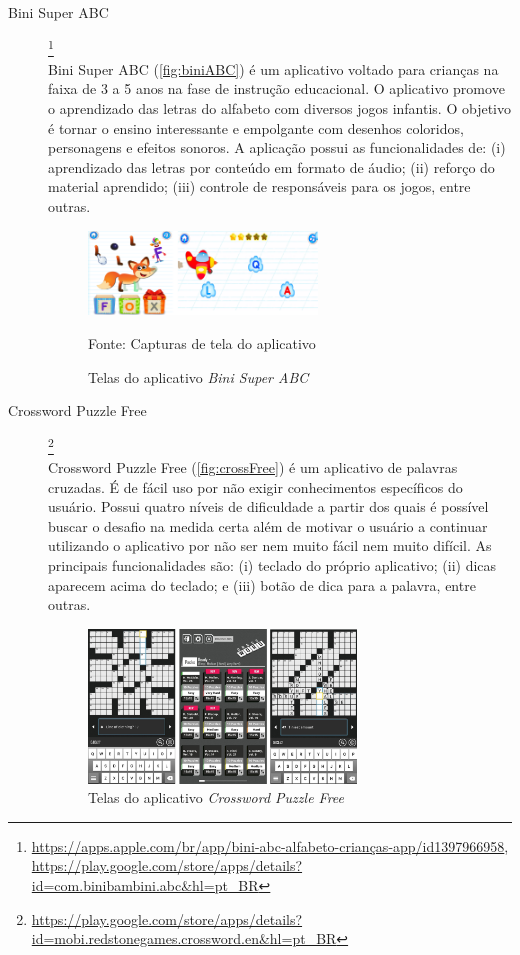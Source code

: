 \begin{description}
\item[Bini Super ABC]\footnote{\url{https://apps.apple.com/br/app/bini-abc-alfabeto-crianças-app/id1397966958}, \url{https://play.google.com/store/apps/details?id=com.binibambini.abc&hl=pt_BR}} \hfill \\
Bini Super ABC (\autoref{fig:biniABC}) é um aplicativo voltado para crianças na faixa de 3 a 5 anos na fase de instrução educacional. O aplicativo promove o aprendizado das letras do alfabeto com diversos jogos infantis. O objetivo é tornar o ensino interessante e empolgante com desenhos coloridos, personagens e efeitos sonoros. A aplicação possui as funcionalidades de: (i) aprendizado das letras por conteúdo em formato de áudio; (ii) reforço do material aprendido; (iii) controle de responsáveis para os jogos, entre outras.

\begin{figure}[H]
\centering
    \caption{Telas do aplicativo \textit{Bini Super ABC}}
    \label{fig:biniABC}
    \includegraphics[width=0.6\textwidth]{Figuras/biniabc.png}
    
    Fonte: Capturas de tela do aplicativo
\end{figure}

\item[Crossword Puzzle Free]\footnote{\url{https://play.google.com/store/apps/details?id=mobi.redstonegames.crossword.en&hl=pt_BR}} \hfill \\
Crossword Puzzle Free (\autoref{fig:crossFree}) é um aplicativo de palavras cruzadas. É de fácil  uso por não exigir conhecimentos específicos do usuário. Possui quatro níveis de dificuldade a partir dos quais é possível buscar o desafio na medida certa além de motivar o usuário a continuar utilizando o aplicativo por não ser nem muito fácil nem muito difícil. As principais funcionalidades são: (i) teclado do próprio aplicativo; (ii) dicas aparecem acima do teclado; e (iii) botão de dica para a palavra, entre outras.


\begin{figure}[H]
\centering
    \caption{Telas do aplicativo \textit{Crossword Puzzle Free}}
    \label{fig:crossFree}
    \includegraphics[width=0.7\textwidth]{Figuras/crosswordPuzzleFree.jpg}
    

\end{figure}
\end{description}
